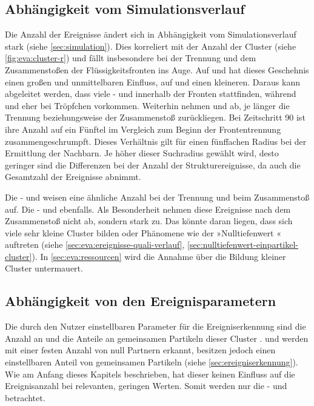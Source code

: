 \subsection*{Abhängigkeit vom Simulationsverlauf}\label{sec:eva:ereignis-verlauf}
Die Anzahl der Ereignisse ändert sich in Abhängigkeit vom Simulationsverlauf stark (siehe \autoref{sec:simulation}). Dies korreliert mit der Anzahl der Cluster (siehe \autoref{fig:eva:cluster-r}) und fällt insbesondere bei der Trennung und dem Zusammenstoßen der Flüssigkeitsfronten ins Auge. Auf  und  hat dieses Geschehnis einen großen und unmittelbaren Einfluss, auf  und  einen kleineren.
Daraus kann abgeleitet werden, dass viele - und  innerhalb der Fronten stattfinden, während  und  eher bei Tröpfchen vorkommen. Weiterhin nehmen  und  ab, je länger die Trennung beziehungsweise der Zusammenstoß zurückliegen. Bei Zeitschritt 90 ist ihre Anzahl auf ein Fünftel im Vergleich zum Beginn der Frontentrennung zusammengeschrumpft. Dieses Verhältnis gilt für einen fünffachen Radius bei der Ermittlung der Nachbarn. Je höher dieser Suchradius gewählt wird, desto geringer sind die Differenzen bei der Anzahl der Strukturereignisse, da auch die Gesamtzahl der Ereignisse abnimmt.

Die - und  weisen eine ähnliche Anzahl bei der Trennung und beim Zusammenstoß auf. Die - und  ebenfalls. Als Besonderheit nehmen diese Ereignisse nach dem Zusammenstoß nicht ab, sondern stark zu. Das könnte daran liegen, dass sich viele sehr kleine Cluster bilden oder Phänomene wie der »Nulltiefenwert « auftreten (siehe \autoref{sec:eva:ereignisse-quali-verlauf}, \autoref{sec:nulltiefenwert-einpartikel-cluster}). In \autoref{sec:eva:ressourcen} wird die Annahme über die Bildung kleiner Cluster untermauert.

\subsection*{Abhängigkeit von den Ereignisparametern}\label{sec:eva:ereignis-param}
Die durch den Nutzer einstellbaren Parameter für die Ereigniserkennung sind die Anzahl an   und die Anteile an gemeinsamen Partikeln dieser Cluster .  und  werden mit einer festen Anzahl von null Partnern erkannt, besitzen jedoch einen einstellbaren Anteil von gemeinsamen Partikeln  (siehe \autoref{sec:ereigniserkennung}). Wie am Anfang dieses Kapitels beschrieben, hat dieser keinen Einfluss auf die Ereignisanzahl bei relevanten, geringen Werten. Somit werden nur die - und  betrachtet.

